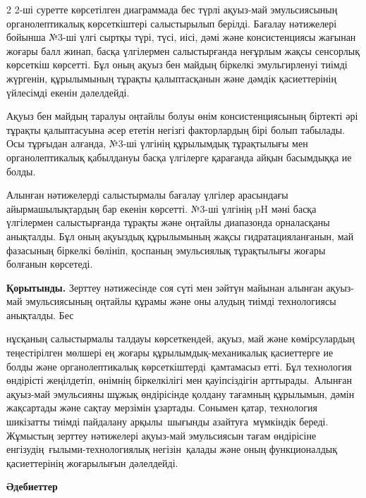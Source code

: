 \begin{multicols}{2}
2-ші суретте көрсетілген диаграммада бес түрлі ақуыз-май эмульсиясының
органолептикалық көрсеткіштері салыстырылып берілді. Бағалау нәтижелері
бойынша №3-ші үлгі сыртқы түрі, түсі, иісі, дәмі және консистенциясы
жағынан жоғары балл жинап, басқа үлгілермен салыстырғанда неғұрлым жақсы
сенсорлық көрсеткіш көрсетті. Бұл оның ақуыз бен майдың біркелкі
эмульгирленуі тиімді жүргенін, құрылымының тұрақты қалыптасқанын және
дәмдік қасиеттерінің үйлесімді екенін дәлелдейді.

Ақуыз бен майдың таралуы оңтайлы болуы өнім консистенциясының біртекті
әрі тұрақты қалыптасуына әсер ететін негізгі факторлардың бірі болып
табылады. Осы тұрғыдан алғанда, №3-ші үлгінің құрылымдық тұрақтылығы мен
органолептикалық қабылдануы басқа үлгілерге қарағанда айқын басымдыққа
ие болды.

Алынған нәтижелерді салыстырмалы бағалау үлгілер арасындағы
айырмашылықтардың бар екенін көрсетті. №3-ші үлгінің pH мәні басқа
үлгілермен салыстырғанда тұрақты және оңтайлы диапазонда орналасқаны
анықталды. Бұл оның ақуыздық құрылымының жақсы гидратацияланғанын, май
фазасының біркелкі бөлініп, қоспаның эмульсиялық тұрақтылығы жоғары
болғанын көрсетеді.

{\bfseries Қорытынды.} Зерттеу нәтижесінде соя сүті мен зәйтүн майынан
алынған ақуыз-май эмульсиясының оңтайлы құрамы және оны алудың тиімді
технологиясы анықталды. Бес

нұсқаның салыстырмалы талдауы көрсеткендей, ақуыз, май және
көмірсулардың теңестірілген мөлшері ең жоғары құрылымдық-механикалық
қасиеттерге ие болды және органолептикалық көрсеткіштерді~қамтамасыз
етті. Бұл технология өндірісті жеңілдетіп, өнімнің біркелкілігі мен
қауіпсіздігін арттырады.~Алынған ақуыз-май эмульсияны шұжық өндірісінде
қолдану тағамның құрылымын, дәмін жақсартады және сақтау мерзімін
ұзартады. Сонымен қатар, технология шикізатты тиімді пайдалану
арқылы~шығынды азайтуға~мүмкіндік береді. Жұмыстың зерттеу нәтижелері
ақуыз-май эмульсиясын тағам өндірісіне енгізудің~ғылыми-технологиялық
негізін~қалады және оның функционалдық қасиеттерінің жоғарылығын
дәлелдейді.
\end{multicols}

\begin{center}
{\bfseries Әдебиеттер}
\end{center}

